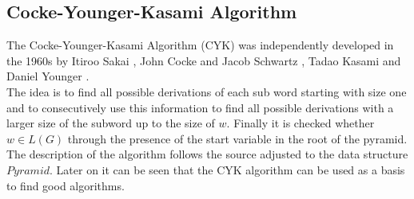 \subsection{ Cocke-Younger-Kasami Algorithm}
The Cocke-Younger-Kasami Algorithm (CYK) was independently developed in the 1960s by Itiroo Sakai \cite{Sakai.1962}, John Cocke and Jacob Schwartz \cite{JohnCockeJacobT.Schwartz.1970}, Tadao Kasami \cite{Kasami.1966} and Daniel Younger \cite{YOUNGER.1967}.\\
The idea is to find all possible derivations of each sub word starting with size one and to consecutively use this information to find all possible derivations with a larger size of the subword up to the size of $w$. Finally it is checked whether $w \in L(G)$ through the presence of the start variable in the root of the pyramid. \\
The description of the algorithm follows the source \cite{Hoffmann.2015} adjusted to the data structure $Pyramid$. 
Later on it can be seen that the CYK algorithm can be used as a basis to find good algorithms.\\

